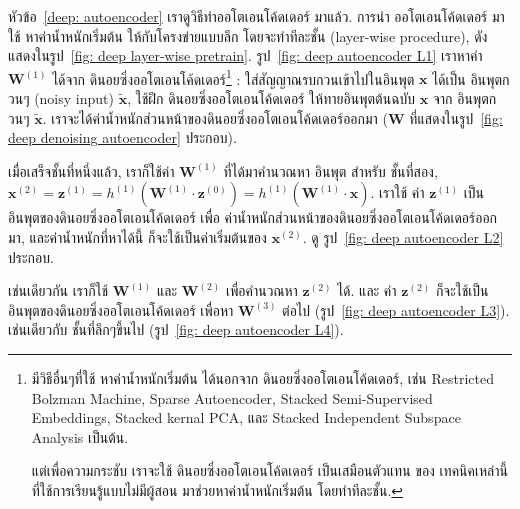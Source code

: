 หัวข้อ~\ref{deep: autoencoder} เราดูวิธีทำออโตเอนโค้ดเดอร์ มาแล้ว.
การนำ ออโตเอนโค้ดเดอร์ มาใช้ หาค่าน้ำหนักเริ่มต้น ให้กับโครงข่ายแบบลึก โดยจะทำทีละชั้น (layer-wise procedure), ดังแสดงในรูป~\ref{fig: deep layer-wise pretrain}.
รูป~\ref{fig: deep autoencoder L1} เราหาค่า $\mathbf{W}^{(1)}$ ได้จาก ดินอยซิ่งออโตเอนโค้ดเดอร์\footnote{
มีวิธีอื่นๆที่ใช้ หาค่าน้ำหนักเริ่มต้น ได้นอกจาก ดินอยซิ่งออโตเอนโค้ดเดอร์\cite{VicentEtAl2008a}, เช่น Restricted Bolzman Machine\cite{HintonEtAl2006a}, 
Sparse Autoencoder\cite{RanzatoEtAl2007a},
Stacked Semi-Supervised Embeddings\cite{WestonEtAl2008a},
Stacked kernal PCA\cite{ChoSaul2009a},
และ
Stacked Independent Subspace Analysis\cite{LeEtAl2011a} เป็นต้น.

แต่เพื่อความกระชับ เราจะใช้ ดินอยซิ่งออโตเอนโค้ดเดอร์ เป็นเสมือนตัวแทน ของ เทคนิคเหล่านี้ ที่ใช้การเรียนรู้แบบไม่มีผู้สอน มาช่วยหาค่าน้ำหนักเริ่มต้น โดยทำทีละชั้น.
}%
: ใส่สัญญาณรบกวนเข้าไปในอินพุต $\mathbf{x}$ ได้เป็น อินพุตกวนๆ (noisy input) $\mathbf{\tilde{x}}$,
ใช้ฝึก %
ดินอยซิ่งออโตเอนโค้ดเดอร์ ให้ทายอินพุตต้นฉบับ $\mathbf{x}$ จาก อินพุตกวนๆ $\mathbf{\tilde{x}}$.
เราจะได้ค่าน้ำหนักส่วนหน้าของดินอยซิ่งออโตเอนโค้ดเดอร์ออกมา ($\mathbf{W}$ ที่แสดงในรูป~\ref{fig: deep denoising autoencoder} ประกอบ).

เมื่อเสร็จชั้นที่หนึ่งแล้ว, เราก็ใช้ค่า $\mathbf{W}^{(1)}$ ที่ได้มาคำนวณหา อินพุต สำหรับ ชั้นที่สอง, $\mathbf{x}^{(2)} = \mathbf{z}^{(1)} = h^{(1)}(\mathbf{W}^{(1)} \cdot \mathbf{z}^{(0)}) = h^{(1)}(\mathbf{W}^{(1)} \cdot \mathbf{x})$.
เราใช้ ค่า $\mathbf{z}^{(1)}$ เป็น อินพุตของดินอยซิ่งออโตเอนโค้ดเดอร์ เพื่อ ค่าน้ำหนักส่วนหน้าของดินอยซิ่งออโตเอนโค้ดเดอร์ออกมา, และค่าน้ำหนักที่หาได้นี้ ก็จะใช้เป็นค่าเริ่มต้นของ $\mathbf{x}^{(2)}$.
ดู รูป~\ref{fig: deep autoencoder L2} ประกอบ.

เช่นเดียวกัน เราก็ใช้ $\mathbf{W}^{(1)}$ และ $\mathbf{W}^{(2)}$ เพื่อคำนวณหา $\mathbf{z}^{(2)}$ ได้.
และ ค่า $\mathbf{z}^{(2)}$ ก็จะใช้เป็น อินพุตของดินอยซิ่งออโตเอนโค้ดเดอร์ เพื่อหา $\mathbf{W}^{(3)}$ ต่อไป (รูป~\ref{fig: deep autoencoder L3}).
เช่นเดียวกับ ชั้นที่ลึกๆขึ้นไป (รูป~\ref{fig: deep autoencoder L4}).

